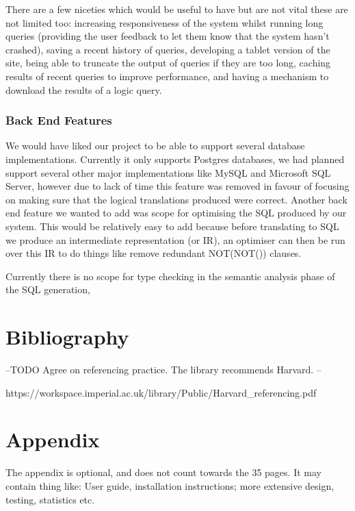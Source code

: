 \documentclass[a4paper, 11pt]{article}
\begin{document}
    There are a few niceties which would be useful to have but are not vital
    these are not limited too: increasing responsiveness of the system whilst 
    running long queries (providing the user feedback to let them know that the
    system hasn't crashed), saving a recent history of queries, developing a 
    tablet version of the site, being able to truncate the output of queries if 
    they are too long, caching results of recent queries to improve performance,
    and having a mechanism to download the results of a logic query.  

    
    \subsubsection{Back End Features} 
    We would have liked our project to be able to support several database
    implementations. Currently it only supports Postgres databases, we had
    planned support several other major implementations like MySQL and
    Microsoft SQL Server, however due to lack of time this feature was removed
    in favour of focusing on making sure that the logical translations produced
    were correct. Another back end feature we wanted to add was scope for
    optimising the SQL produced by our system. This would be relatively easy to
    add because before translating to SQL we produce an intermediate
    representation (or IR), an optimiser can then be run over this IR to do
    things like remove redundant NOT(NOT()) clauses.
   
    Currently there is no scope for type checking in the semantic analysis phase
    of the SQL generation,

   
    

\section{Bibliography}
  \printbibliography

  --TODO Agree on referencing practice. The library recommends Harvard. --

  https://workspace.imperial.ac.uk/library/Public/Harvard\_referencing.pdf

\appendix
\section{Appendix}
  The appendix is optional, and does not count towards the 35 pages. It may
  contain thing like: User guide, installation instructions; more extensive
  design, testing, statistics etc.
\end{document}
